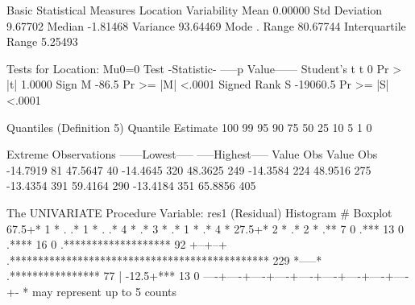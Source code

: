 \documentclass{article}
\begin{document}
\begin{Woutput}
              Basic Statistical Measures
    Location                    Variability
Mean      0.00000     Std Deviation            9.67702
Median   -1.81468     Variance                93.64469
Mode       .          Range                   80.67744
                      Interquartile Range      5.25493

           Tests for Location: Mu0=0
Test           -Statistic-    -----p Value------
Student's t    t         0    Pr > |t|    1.0000
Sign           M     -86.5    Pr >= |M|   <.0001
Signed Rank    S  -19060.5    Pr >= |S|   <.0001

Quantiles (Definition 5)
Quantile        Estimate
100%
99%
95%
90%
75%
50%
25%
10%
5%
1%
0%

           Extreme Observations
------Lowest-----        -----Highest-----
   Value      Obs           Value      Obs
-14.7919       81         47.5647       40
-14.4645      320         48.3625      249
-14.3584      224         48.9516      275
-13.4354      391         59.4164      290
-13.4184      351         65.8856      405

The UNIVARIATE Procedure
Variable:  res1  (Residual)
                         Histogram                         #  Boxplot
   67.5+*                                                  1     *
       .
       .*                                                  1     *
       .
       .*                                                  4     *
       .*                                                  3     *
       .*                                                  1     *
       .*                                                  4     *
   27.5+*                                                  2     *
       .*                                                  2     *
       .**                                                 7     0
       .***                                               13     0
       .****                                              16     0
       .*******************                               92  +--+--+
       .**********************************************   229  *-----*
       .****************                                  77     |
  -12.5+***                                               13     0
        ----+----+----+----+----+----+----+----+----+-
        * may represent up to 5 counts


\end{Woutput}
\end{document}
